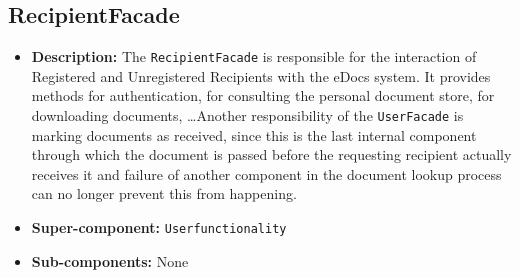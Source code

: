 \documentclass[a4paper,10pt]{article}
\begin{document}
\subsection{RecipientFacade}
\begin{itemize}
    \item \textbf{Description:} The \texttt{RecipientFacade} is responsible for the interaction of Registered and Unregistered Recipients with the eDocs system. It provides methods for authentication, for consulting the personal document store, for downloading documents, \dots Another responsibility of the \texttt{UserFacade} is marking documents as received, since this is the last internal component through which the document is passed before the requesting recipient actually receives it and failure of another component in the document lookup process can no longer prevent this from happening.
    \item \textbf{Super-component:} \texttt{Userfunctionality}
    \item \textbf{Sub-components:} None
\end{itemize}
\end{document}
